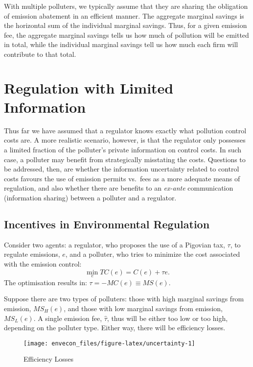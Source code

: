 \documentclass[
]{book}
\begin{document}
With multiple polluters, we typically assume that they are sharing the obligation of emission abatement in an efficient manner. The aggregate marginal savings is the horizontal sum of the individual marginal savings. Thus, for a given emission fee, the aggregate marginal savings tells us how much of pollution will be emitted in total, while the individual marginal savings tell us how much each firm will contribute to that total.

\hypertarget{regulation-with-limited-information}{%
\chapter{Regulation with Limited Information}\label{regulation-with-limited-information}}

Thus far we have assumed that a regulator knows exactly what pollution control costs are. A more realistic scenario, however, is that the regulator only possesses a limited fraction of the polluter's private information on control costs.
In such case, a polluter may benefit from strategically misstating the costs. Questions to be addressed, then, are whether the information uncertainty related to control costs favours the use of emission permits vs.~fees as a more adequate means of regulation, and also whether there are benefits to an \emph{ex-ante} communication (information sharing) between a polluter and a regulator.

\hypertarget{incentives-in-environmental-regulation}{%
\section{Incentives in Environmental Regulation}\label{incentives-in-environmental-regulation}}

Consider two agents: a regulator, who proposes the use of a Pigovian tax, \(\tau\), to regulate emissions, \(e\), and a polluter, who tries to minimize the cost associated with the emission control: \[\min_e TC(e) = C(e) + \tau e.\] The optimisation results in: \(\tau = -MC(e) \equiv MS(e)\).

Suppose there are two types of polluters: those with high marginal savings from emission, \(MS_H(e)\), and those with low marginal savings from emission, \(MS_L(e)\). A single emission fee, \(\hat{\tau}\), thus will be either too low or too high, depending on the polluter type. Either way, there will be efficiency losses.

\begin{figure}

{\centering \texttt{[image: envecon\_files/figure-latex/uncertainty-1]} 

}

\caption{Efficiency Losses}\label{fig:uncertainty}
\end{figure}
\end{document}
